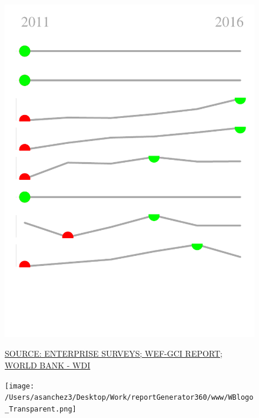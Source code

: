 \documentclass{article}\usepackage[]{graphicx}\usepackage[]{color}
\makeatletter
\def\maxwidth{ %
  \ifdim\Gin@nat@width>\linewidth
    \linewidth
  \else
    \Gin@nat@width
  \fi
}
\makeatother
\begin{document}
\begin{figure}
\begin{minipage}[c]{0.95\textwidth}
\begin{minipage}[c]{0.125\textwidth}
{\centering \includegraphics[width=\maxwidth]{figure/sparklines_Supports-1} 

}



    \vspace*{-0.5cm}
  \end{minipage}
  
  \scriptsize{\href{NA}{\textcolor[HTML]{22A6F5}{SOURCE: ENTERPRISE SURVEYS; WEF-GCI REPORT; WORLD BANK - WDI}}}
\end{minipage}

  \vspace{4ex}
  \begin{minipage}[c]{0.33\textwidth}
    \hspace*{+0.3cm} \texttt{[image: /Users/asanchez3/Desktop/Work/reportGenerator360/www/WBlogo\_Transparent.png]}
  \end{minipage}
  \begin{minipage}[c]{0.65\textwidth}
    \vspace*{-0.1cm}
  \end{minipage}
\end{figure}
\end{document}
